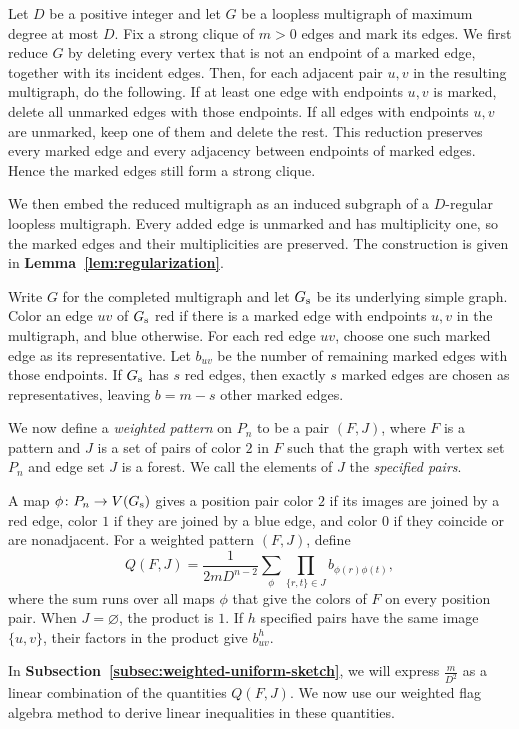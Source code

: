 \documentclass[preprint,11pt,numbers]{elsarticle-arxiv}
\numberwithin{equation}{section}
\theoremstyle{definition}
\begin{document}
Let $D$ be a positive integer and let $G$ be a loopless multigraph
of maximum degree at most $D$. Fix a strong clique of $m>0$ edges
and mark its edges. We first reduce $G$ by deleting every vertex
that is not an endpoint of a marked edge, together with its incident
edges. Then, for each adjacent pair $u,v$ in the resulting multigraph,
do the following. If at least one edge with endpoints $u,v$ is
marked, delete all unmarked edges with those endpoints. If all edges
with endpoints $u,v$ are unmarked, keep one of them and delete the
rest. This reduction preserves every marked edge and every adjacency
between endpoints of marked edges. Hence the marked edges still form
a strong clique.

We then embed the reduced multigraph as an induced subgraph of a
$D$-regular loopless multigraph. Every added edge is unmarked and
has multiplicity one, so the marked edges and their multiplicities
are preserved. The construction is given in
\textbf{Lemma~\ref{lem:regularization}}.

Write $G$ for the completed multigraph and let $G_{\rm s}$ be its
underlying simple graph. Color an edge $uv$ of $G_{\rm s}$ red if there is a marked
edge with endpoints $u,v$ in the multigraph, and blue otherwise.
For each red edge $uv$, choose one such marked edge as its
representative. Let $b_{uv}$ be the number of remaining marked edges
with those endpoints. If $G_{\rm s}$ has $s$ red edges, then exactly
$s$ marked edges are chosen as representatives, leaving $b=m-s$
other marked edges.

We now define a \emph{weighted pattern} on $P_n$ to be a pair $(F,J)$,
where $F$ is a pattern and $J$ is a set of pairs of color $2$ in
$F$ such that the graph with vertex set $P_n$ and edge set $J$ is a
forest. We call the elements of $J$ the \emph{specified pairs}.

A map $\phi\colon P_n\to V(G_{\rm s})$ gives a position pair color
$2$ if its images are joined by a red edge, color $1$ if they are
joined by a blue edge, and color $0$ if they coincide or are
nonadjacent. For a weighted pattern $(F,J)$, define
\[
 Q(F,J)=\frac{1}{2mD^{n-2}}\sum_\phi
        \prod_{\{r,t\}\in J} b_{\phi(r)\phi(t)},
\]
where the sum runs over all maps $\phi$ that give the colors of $F$
on every position pair. When $J=\varnothing$, the product is $1$.
If $h$ specified pairs have the same image $\{u,v\}$, their factors
in the product give $b_{uv}^{h}$.

In \textbf{Subsection~\ref{subsec:weighted-uniform-sketch}}, we will
express $\frac{m}{D^2}$ as a linear combination of the quantities
$Q(F,J)$. We now use our weighted flag algebra method to derive
linear inequalities in these quantities.
\end{document}
